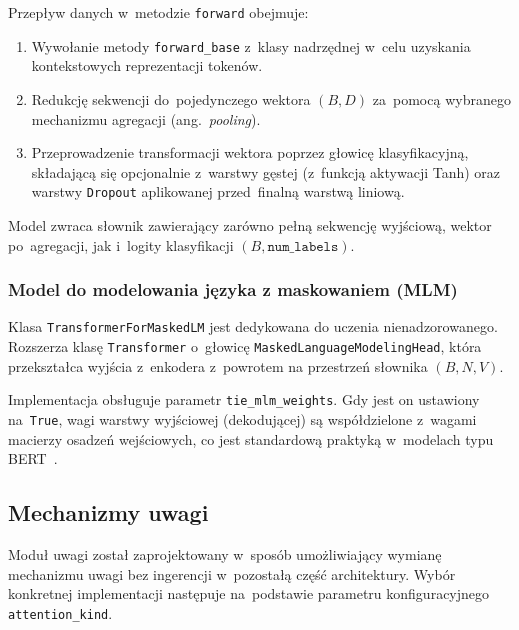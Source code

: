 \documentclass[a4paper,11pt,twoside]{report}
\theoremstyle{definition}
\begin{document}
Przepływ danych w~metodzie \texttt{forward} obejmuje:
\begin{enumerate}
    \item Wywołanie metody \texttt{forward\_base} z~klasy nadrzędnej w~celu uzyskania kontekstowych reprezentacji tokenów.
    \item Redukcję sekwencji do~pojedynczego wektora $(B, D)$ za~pomocą wybranego mechanizmu agregacji (ang.\ \emph{pooling}).
    \item Przeprowadzenie transformacji wektora poprzez głowicę klasyfikacyjną, składającą się opcjonalnie z~warstwy gęstej (z~funkcją aktywacji Tanh) oraz warstwy \texttt{Dropout} aplikowanej przed~finalną warstwą liniową.
\end{enumerate}
Model zwraca słownik zawierający zarówno pełną sekwencję wyjściową, wektor po~agregacji, jak i~logity klasyfikacji $(B, \texttt{num\_labels})$.

\subsubsection{Model do modelowania języka z maskowaniem (MLM)}
Klasa \texttt{TransformerForMaskedLM} jest dedykowana do uczenia nienadzorowanego. Rozszerza klasę \texttt{Transformer} o~głowicę \texttt{MaskedLanguageModelingHead}, która przekształca wyjścia z~enkodera z~powrotem na przestrzeń słownika $(B, N, V)$.

Implementacja obsługuje parametr \texttt{tie\_mlm\_weights}. Gdy jest on ustawiony na~\texttt{True}, wagi warstwy wyjściowej (dekodującej) są współdzielone z~wagami macierzy osadzeń wejściowych, co jest standardową praktyką w~modelach typu BERT~\cite{devlin2019bert}.







\subsection{Mechanizmy uwagi}\label{sec:arch-attention}

Moduł uwagi został zaprojektowany w~sposób umożliwiający wymianę mechanizmu uwagi bez ingerencji w~pozostałą część architektury. Wybór konkretnej implementacji następuje na~podstawie parametru konfiguracyjnego \texttt{attention\_kind}.
\end{document}
